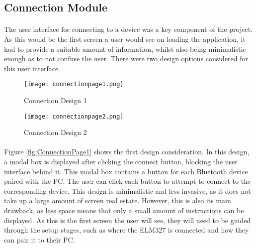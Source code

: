 	\subsection{Connection Module}{
		\paragraph{}{
		The user interface for connecting to a device was a key component of the project. As this would be the first screen a user would see on loading the application, it had to provide a suitable amount of information, whilst also being minimalistic enough as to not confuse the user. There were two design options considered for this user interface. 
		}

		\begin{figure}[h]
			\begin{center}								
				\begin{minipage}{0.49\textwidth}
					\texttt{[image: connectionpage1.png]}
					\caption{Connection Design 1}						
					\label{fig:ConnectionPage1}
				\end{minipage}
				\hfill			
				\begin{minipage}{0.49\textwidth}
					\texttt{[image: connectionpage2.png]}
					\caption{Connection Design 2}						
					\label{fig:ConnectionPage2}
				\end{minipage}									
			\end{center}
		\end{figure}
		
		\paragraph{}{
		Figure \ref{fig:ConnectionPage1} shows the first design consideration. In this design, a modal box is displayed after clicking the connect button, blocking the user interface behind it. This modal box contains a button for each Bluetooth device paired with the PC. The user can click each button to attempt to connect to the corresponding device. This design is minimalistic and less invasive, as it does not take up a large amount of screen real estate. However, this is also its main drawback, as less space means that only a small amount of instructions can be displayed. As this is the first screen the user will see, they will need to be guided through the setup stages, such as where the ELM327 is connected and how they can pair it to their PC.
		}
		
}
